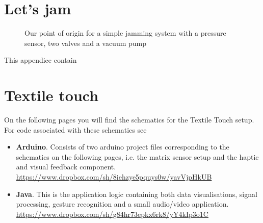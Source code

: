 \section{Let's jam}

\begin{landscape}
	\thispagestyle{empty}
	\centering
	\begin{figure}[p]
	    \caption{Our point of origin for a simple jamming system with a pressure sensor, two valves and a vacuum pump}
	\end{figure}
\end{landscape}

This appendice contain

\section{Textile touch}
\label{app:textile-touch}

On the following pages you will find the schematics for the Textile Touch setup.
For code associated with these schematics see
\begin{itemize}
	\item{\textbf{Arduino}. Consists of two arduino project files corresponding to the schematics on the following pages, i.e. the matrix sensor setup and the haptic and visual feedback component.\\
		\url{https://www.dropbox.com/sh/8iehzye5pquys0w/yavVjpHkUB} } 
	\item{\textbf{Java}. This is the application logic containing both data visualisations, signal processing, gesture recognition and a small audio/video application.\\
	 \url{https://www.dropbox.com/sh/g84hr73epkx6rk8/yY4kIp3o1C} } 
\end{itemize}

